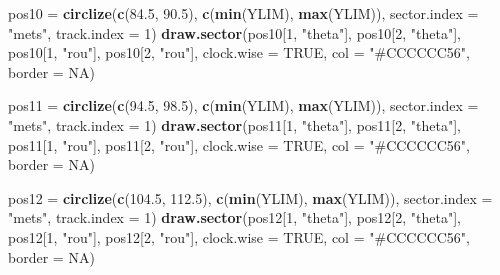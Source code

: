 \documentclass[
]{article}
\newenvironment{Shaded}{\begin{snugshade}}{\end{snugshade}}
\newcommand{\DataTypeTok}[1]{\textcolor[rgb]{0.13,0.29,0.53}{#1}}
\newcommand{\DecValTok}[1]{\textcolor[rgb]{0.00,0.00,0.81}{#1}}
\newcommand{\FloatTok}[1]{\textcolor[rgb]{0.00,0.00,0.81}{#1}}
\newcommand{\KeywordTok}[1]{\textcolor[rgb]{0.13,0.29,0.53}{\textbf{#1}}}
\newcommand{\NormalTok}[1]{#1}
\newcommand{\OtherTok}[1]{\textcolor[rgb]{0.56,0.35,0.01}{#1}}
\newcommand{\StringTok}[1]{\textcolor[rgb]{0.31,0.60,0.02}{#1}}
\begin{document}
\begin{Shaded}
\begin{Highlighting}[]
\NormalTok{pos10 =}\StringTok{ }\KeywordTok{circlize}\NormalTok{(}\KeywordTok{c}\NormalTok{(}\FloatTok{84.5}\NormalTok{, }\FloatTok{90.5}\NormalTok{), }\KeywordTok{c}\NormalTok{(}\KeywordTok{min}\NormalTok{(YLIM), }\KeywordTok{max}\NormalTok{(YLIM)), }\DataTypeTok{sector.index =} \StringTok{"mets"}\NormalTok{, }\DataTypeTok{track.index =} \DecValTok{1}\NormalTok{)}
\KeywordTok{draw.sector}\NormalTok{(pos10[}\DecValTok{1}\NormalTok{, }\StringTok{"theta"}\NormalTok{], pos10[}\DecValTok{2}\NormalTok{, }\StringTok{"theta"}\NormalTok{], pos10[}\DecValTok{1}\NormalTok{, }\StringTok{"rou"}\NormalTok{], pos10[}\DecValTok{2}\NormalTok{, }\StringTok{"rou"}\NormalTok{], }\DataTypeTok{clock.wise =} \OtherTok{TRUE}\NormalTok{, }\DataTypeTok{col =} \StringTok{"#CCCCCC56"}\NormalTok{, }\DataTypeTok{border =} \OtherTok{NA}\NormalTok{) }

\NormalTok{pos11 =}\StringTok{ }\KeywordTok{circlize}\NormalTok{(}\KeywordTok{c}\NormalTok{(}\FloatTok{94.5}\NormalTok{, }\FloatTok{98.5}\NormalTok{), }\KeywordTok{c}\NormalTok{(}\KeywordTok{min}\NormalTok{(YLIM), }\KeywordTok{max}\NormalTok{(YLIM)), }\DataTypeTok{sector.index =} \StringTok{"mets"}\NormalTok{, }\DataTypeTok{track.index =} \DecValTok{1}\NormalTok{)}
\KeywordTok{draw.sector}\NormalTok{(pos11[}\DecValTok{1}\NormalTok{, }\StringTok{"theta"}\NormalTok{], pos11[}\DecValTok{2}\NormalTok{, }\StringTok{"theta"}\NormalTok{], pos11[}\DecValTok{1}\NormalTok{, }\StringTok{"rou"}\NormalTok{], pos11[}\DecValTok{2}\NormalTok{, }\StringTok{"rou"}\NormalTok{], }\DataTypeTok{clock.wise =} \OtherTok{TRUE}\NormalTok{, }\DataTypeTok{col =} \StringTok{"#CCCCCC56"}\NormalTok{, }\DataTypeTok{border =} \OtherTok{NA}\NormalTok{) }

\NormalTok{pos12 =}\StringTok{ }\KeywordTok{circlize}\NormalTok{(}\KeywordTok{c}\NormalTok{(}\FloatTok{104.5}\NormalTok{, }\FloatTok{112.5}\NormalTok{), }\KeywordTok{c}\NormalTok{(}\KeywordTok{min}\NormalTok{(YLIM), }\KeywordTok{max}\NormalTok{(YLIM)), }\DataTypeTok{sector.index =} \StringTok{"mets"}\NormalTok{, }\DataTypeTok{track.index =} \DecValTok{1}\NormalTok{)}
\KeywordTok{draw.sector}\NormalTok{(pos12[}\DecValTok{1}\NormalTok{, }\StringTok{"theta"}\NormalTok{], pos12[}\DecValTok{2}\NormalTok{, }\StringTok{"theta"}\NormalTok{], pos12[}\DecValTok{1}\NormalTok{, }\StringTok{"rou"}\NormalTok{], pos12[}\DecValTok{2}\NormalTok{, }\StringTok{"rou"}\NormalTok{], }\DataTypeTok{clock.wise =} \OtherTok{TRUE}\NormalTok{, }\DataTypeTok{col =} \StringTok{"#CCCCCC56"}\NormalTok{, }\DataTypeTok{border =} \OtherTok{NA}\NormalTok{) }


\end{Highlighting}
\end{Shaded}
\end{document}
